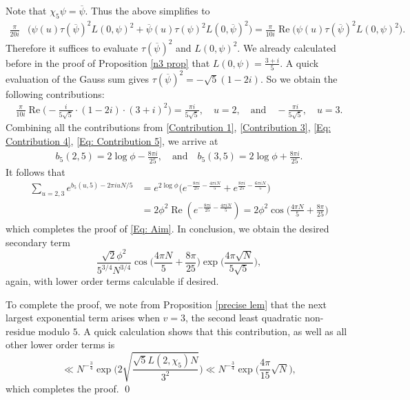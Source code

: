 \documentclass[11pt]{amsart}
\numberwithin{equation}{section}
\newcommand{\ol}{\overline}
\theoremstyle{remark}
\begin{document}
Note that $\chi_5 \psi = \ol{\psi}$. Thus the above simplifies to
\begin{align*}
\frac{\pi}{20i} &\bigg( \psi(u)\tau(\ol{\psi})^2L(0,\psi)^2 + \ol{\psi}(u)\tau({\psi})^2L(0,\ol{\psi})^2\bigg)=\frac{\pi}{10i} \operatorname{Re}\bigg( \psi(u)\tau(\ol{\psi})^2L(0,\psi)^2  \bigg).
\end{align*}
Therefore it suffices to evaluate $\tau(\ol{\psi})^2$ and $L(0,\psi)^2$. We already calculated before in the proof of Proposition \ref{n3 prop} that $L(0,{\psi})=
\tfrac{3+i}{5}$. A quick evaluation of the Gauss sum gives $\tau(\ol{\psi})^2 = -\sqrt{5}(1-2i)$. So we obtain the following contributions:
\begin{align}\label{Eq: Contribution 5}
    \frac{\pi}{10i} \operatorname{Re}\bigg( -\frac{i}{5\sqrt{5}}\cdot (1-2i) \cdot (3+i)^2  \bigg) = \frac{\pi i}{5\sqrt{5}}, \quad u=2, \quad \textrm{and} \quad -\frac{\pi i}{5\sqrt{5}}, \quad u=3.
\end{align}
Combining all the contributions from \eqref{Contribution 1}, \eqref{Contribution 3}, \eqref{Eq: Contribution 4}, \eqref{Eq: Contribution 5}, we arrive at
\begin{align*}
    b_5(2,5) = 2\log \phi-\frac{8 \pi i }{25}, \quad \textrm{and} \quad
    b_5(3,5) = 2 \log \phi+\frac{8 \pi i}{25}.
\end{align*}
It follows that
\begin{align*}
\sum_{u=2,3}e^{b_5(u,5)-2\pi i uN/5} & = e^{2 \log \phi} \bigg( e^{-\frac{8 \pi i}{25}-\frac{4\pi i N}{5} } + e^{\frac{8 \pi i}{25}-\frac{6\pi i N}{5} }\bigg) \\
& = 2\phi^2 \operatorname{Re} (e^{-\frac{8 \pi i}{25}-\frac{4\pi i N}{5} })= 2\phi^2\cos\bigg(\frac{4\pi N}{5}+\frac{8\pi}{25}\bigg)
\end{align*}
which completes the proof of \eqref{Eq: Aim}. In conclusion, we obtain the desired secondary term
\[
\frac{\sqrt{2}\phi^2}{5^{3/4}N^{3/4}}\cos\bigg(\frac{4\pi N}{5}+\frac{8\pi}{25}\bigg)\exp\bigg(\frac{4\pi\sqrt{N}}{5\sqrt{5}}\bigg),
\]
again, with lower order terms calculable if desired. 
\par
To complete the proof, we note from Proposition \ref{precise lem} that the next largest exponential term arises when $v=3$, the second least quadratic non-residue modulo $5$. A quick calculation shows that this contribution, as well as all other lower order terms is
\[
\ll N^{-\frac34} \exp \bigg(2 \sqrt{\frac{\sqrt{5}L(2,\chi_5) N}{3^2}} \bigg) \ll N^{-\frac34} \exp \bigg(\frac{4 \pi}{15} \sqrt{N}\bigg),
\]
which completes the proof. \qed
\end{document}
